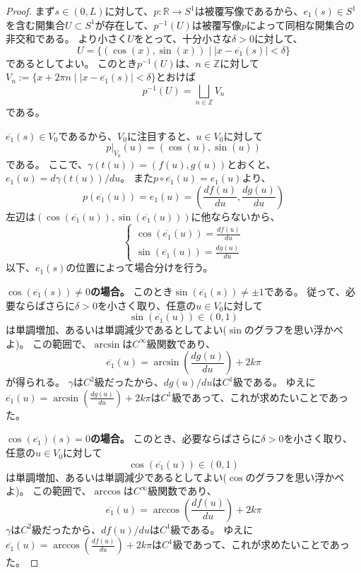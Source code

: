 \begin{proof}
  まず$s\in(0,L)$に対して、$p:\mathbb{R}\to S^1$は被覆写像であるから、$e_1(s)\in S^1$を含む開集合$U\subset S^1$が存在して、$p^{-1}(U)$は被覆写像$p$によって同相な開集合の非交和である。
  より小さく$U$をとって、十分小さな$\delta>0$に対して、
  \[
    U=\{(\cos(x),\sin(x))\mid |x-\overline{e_1}(s)|<\delta\}
  \]
  であるとしてよい。
  このとき$p^{-1}(U)$は、$n\in\mathbb{Z}$に対して$V_n:=\{x+2\pi n\mid |x-\overline{e_1}(s)|<\delta\}$とおけば
  \[
    p^{-1}(U)=\bigsqcup_{n\in\mathbb{Z}}V_n
  \]
  である。

  $\overline{e_1}(s)\in V_0$であるから、$V_0$に注目すると、$u\in V_0$に対して
  \[
    p|_{V_0}(u)=(\cos(u),\sin(u))
  \]
  である。
  ここで、$\gamma(t(u))=(f(u),g(u))$とおくと、$e_1(u)=d\gamma(t(u))/du$。
  また$p\circ\overline{e_1}(u)=e_1(u)$より、
  \[
    p(\overline{e_1}(u))=e_1(u)=\left(\frac{df(u)}{du},\frac{dg(u)}{du}\right)
  \]
  左辺は$(\cos(\overline{e_1}(u)),\sin(\overline{e_1}(u)))$に他ならないから、
  \[
    \begin{cases}
      \cos(\overline{e_1}(u))=\frac{df(u)}{du}\\
      \sin(\overline{e_1}(u))=\frac{dg(u)}{du}
    \end{cases}
  \]
  以下、$e_1(s)$の位置によって場合分けを行う。

  \textbf{$\cos(\overline{e_1}(s))\neq0$の場合。}
  このとき$\sin(\overline{e_1}(s))\neq\pm1$である。
  従って、必要ならばさらに$\delta>0$を小さく取り、任意の$u\in V_0$に対して
  \[
    \sin(\overline{e_1}(u))\in(0,1)
  \]
  は単調増加、あるいは単調減少であるとしてよい($\sin$のグラフを思い浮かべよ)。
  この範囲で、$\arcsin$は$C^\infty$級関数であり、
  \[
    \overline{e_1}(u)=\arcsin\left(\frac{dg(u)}{du}\right)+2k\pi
  \]
  が得られる。
  $\gamma$は$C^2$級だったから、$dg(u)/du$は$C^1$級である。
  ゆえに$\overline{e_1}(u)=\arcsin\left(\frac{dg(u)}{du}\right)+2k\pi$は$C^1$級であって、これが求めたいことであった。

  \textbf{$\cos(\overline{e_1})(s)=0$の場合。}
  このとき、必要ならばさらに$\delta>0$を小さく取り、任意の$u\in V_0$に対して
  \[
    \cos(\overline{e_1}(u))\in(0,1)
  \]
  は単調増加、あるいは単調減少であるとしてよい($\cos$のグラフを思い浮かべよ)。
  この範囲で、$\arccos$は$C^\infty$級関数であり、
  \[
    \overline{e_1}(u)=\arccos\left(\frac{df(u)}{du}\right)+2k\pi
  \]
  $\gamma$は$C^2$級だったから、$df(u)/du$は$C^1$級である。
  ゆえに$\overline{e_1}(u)=\arccos\left(\frac{df(u)}{du}\right)+2k\pi$は$C^1$級であって、これが求めたいことであった。
\end{proof}



